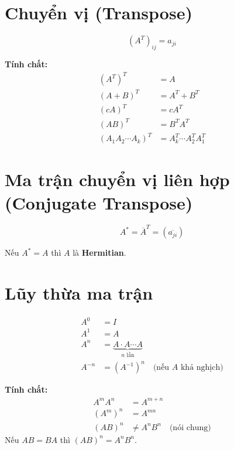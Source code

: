 \section{Chuyển vị (Transpose)}

\[
(A^T)_{ij} = a_{ji}
\]

\textbf{Tính chất:}
\begin{align}
(A^T)^T &= A \\
(A + B)^T &= A^T + B^T \\
(cA)^T &= cA^T \\
(AB)^T &= B^T A^T \\
(A_1 A_2 \cdots A_k)^T &= A_k^T \cdots A_2^T A_1^T
\end{align}

\section{Ma trận chuyển vị liên hợp (Conjugate Transpose)}

\[
A^* = \overline{A}^T = (\overline{a_{ji}})
\]

Nếu $A^* = A$ thì $A$ là \textbf{Hermitian}.

\section{Lũy thừa ma trận}

\begin{align}
A^0 &= I \\
A^1 &= A \\
A^n &= \underbrace{A \cdot A \cdots A}_{n \text{ lần}} \\
A^{-n} &= (A^{-1})^n \quad \text{(nếu } A \text{ khả nghịch)}
\end{align}

\textbf{Tính chất:}
\begin{align}
A^m A^n &= A^{m+n} \\
(A^m)^n &= A^{mn} \\
(AB)^n &\neq A^n B^n \quad \text{(nói chung)}
\end{align}
Nếu $AB = BA$ thì $(AB)^n = A^n B^n$.

